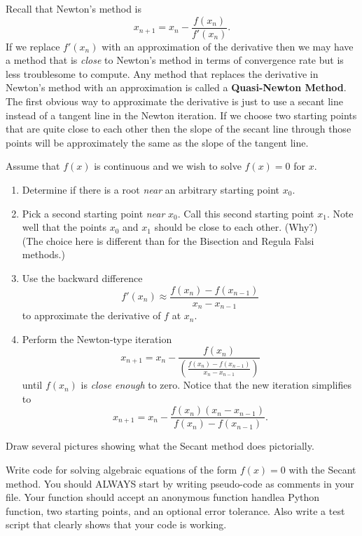 Recall that Newton's method is
\[ x_{n+1} = x_n - \frac{f(x_n)}{f'(x_n)}. \]
If we replace $f'(x_n)$ with an approximation of the derivative then we may have a method
that is {\it close} to Newton's method in terms of convergence rate but is less
troublesome to compute. Any method that replaces the derivative in Newton's method with an
approximation is called a {\bf Quasi-Newton Method}.  The first obvious way to approximate
the derivative is just to use a secant line instead of a tangent line in the Newton
iteration.  If we choose two starting points that are quite close to each other then the
slope of the secant line through those points will be approximately the same as the slope
of the tangent line.  

\begin{algorithm}
    Assume that $f(x)$ is continuous and we wish to solve $f(x) = 0$ for $x$.
    \begin{enumerate}
        \item Determine if there is a root {\it near} an arbitrary starting point $x_0$.
        \item Pick a second starting point {\it near} $x_0$.  Call this second starting
            point $x_1$. Note well that the points $x_0$ and
            $x_1$ should be close to each other. (Why?)\\ (The choice here is different than for
            the Bisection  and Regula Falsi methods.)
        \item Use the backward difference 
            \[ f'(x_n) \approx \frac{f(x_n) - f(x_{n-1})}{x_n - x_{n-1}} \]
            to approximate the derivative of $f$ at $x_n$.
        \item Perform the Newton-type iteration 
            \[ x_{n+1} = x_n - \frac{f(x_n)}{ \left(  \frac{f(x_n) - f(x_{n-1})}{x_n - x_{n-1}}\right)} \]
            until $f(x_n)$ is {\it close enough} to zero.  Notice that the new iteration
            simplifies to
            \[ x_{n+1} = x_n - \frac{f(x_n)\left( x_n - x_{n-1} \right)}{f(x_n) -
            f(x_{n-1})}. \]
    \end{enumerate}
\end{algorithm}

\begin{problem}
    Draw several pictures showing what the Secant method does pictorially.
\end{problem}

\begin{problem}
    Write \ProgLang code for solving algebraic equations of the form $f(x) = 0$ with the
    Secant method.  You should ALWAYS start by writing pseudo-code as comments in your
    \ProgLang file.   Your function should accept \ifnum{} an anonymous function
    handle\else a Python function\fi, two starting
    points, and an optional error tolerance.  Also write a test script that clearly shows that your code is working.
    \\
    \ifnum{}
    \else
    \fi
\end{problem}

